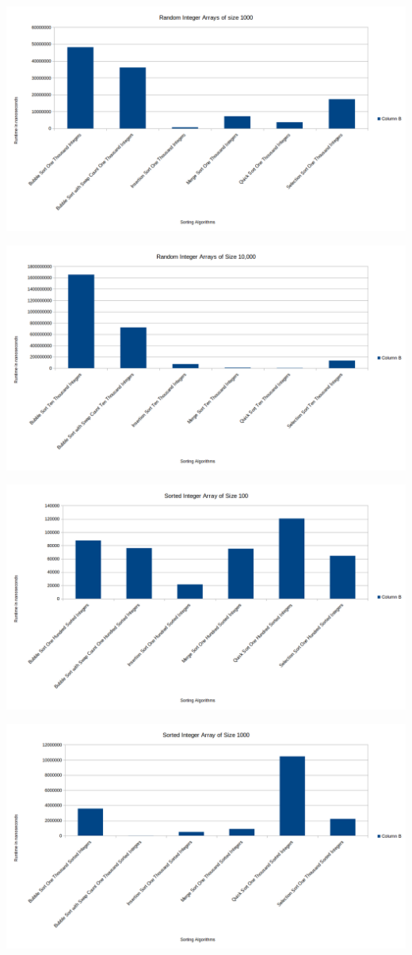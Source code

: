 \documentclass[]{article}
\begin{document}
\centerline{\includegraphics[scale=.5]{random1000}}
\centerline{\includegraphics[scale=.5]{random10000}}
\centerline{\includegraphics[scale=.5]{Sorted100}}	
\centerline{\includegraphics[scale=.5]{Sorted1000}}
\end{document}
